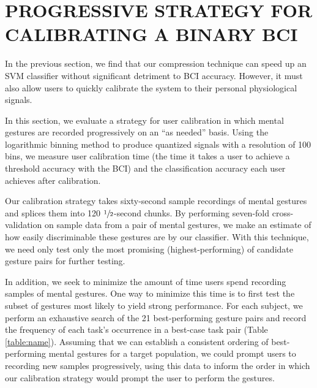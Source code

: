 \section{\uppercase{Progressive strategy for calibrating a binary BCI}}
\label{sec:calibration_eval}

\noindent In the previous section, we find that our compression technique can speed up an SVM classifier without significant detriment to BCI accuracy. However, it must also allow users to quickly calibrate the system to their personal physiological signals.

In this section, we evaluate a strategy for user calibration in which mental gestures are recorded progressively on an ``as needed'' basis. Using the logarithmic binning method to produce quantized signals with a resolution of 100 bins, we measure user calibration time (the time it takes a user to achieve a threshold accuracy with the BCI) and the classification accuracy each user achieves after calibration. 

Our calibration strategy takes sixty-second sample recordings of mental gestures and splices them into 120 $\sfrac{1}{2}$-second chunks. By performing seven-fold cross-validation on sample data from a pair of mental gestures, we make an estimate of how easily discriminable these gestures are by our classifier. With this technique, we need only test only the most promising (highest-performing) of candidate gesture pairs for further testing.

In addition, we seek to minimize the amount of time users spend recording samples of mental gestures. One way to minimize this time is to first test the subset of gestures most likely to yield strong performance. For each subject, we perform an exhaustive search of the 21 best-performing gesture pairs and record the frequency of each task's occurrence in a best-case task pair (Table \ref{table:name}). Assuming that we can establish a consistent ordering of best-performing mental gestures for a target population, we could prompt users to recording new samples progressively, using this data to inform the order in which our calibration strategy would prompt the user to perform the gestures.


